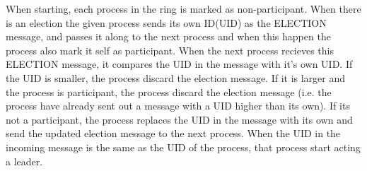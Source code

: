 \documentclass[Main]{subfiles}
\begin{document}
When starting, each process in the ring is marked as non-participant.
When there is an election the given process sends its own ID(UID) as the ELECTION message, and passes it along to the next process and when this happen the process also mark it self as participant. 
When the next process recieves this ELECTION message, it compares the UID in the message with it's own UID. If the UID is smaller, the process discard the election message. If it is larger and the process is participant, the process discard the election message (i.e. the process have already sent out a message with a UID higher than its own). If its not a participant, the process replaces the UID in the message with its own and send the updated election message to the next process. 
When the UID in the incoming message is the same as the UID of the process, that process start acting a leader. \cite{wiki-RingAlgorithm}
\end{document}
